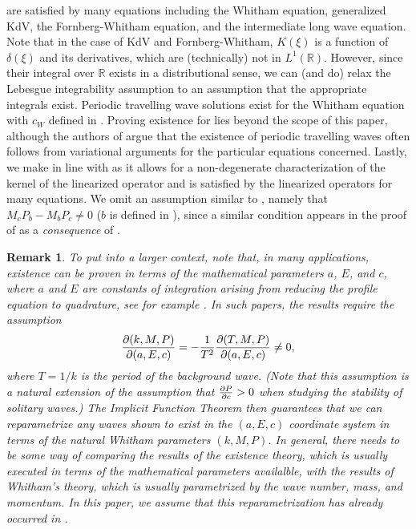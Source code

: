 \documentclass[11pt,leqno]{article}
\numberwithin{equation}{section}
\newcommand{\R}{\mathbb R}
\newtheorem{remark}[theorem]{Remark}
\theoremstyle{definition}
\begin{document}
 are satisfied by many equations including the Whitham equation, generalized KdV, the Fornberg-Whitham equation, and the intermediate long wave equation. Note that in the case of KdV and Fornberg-Whitham, $ K(\xi) $ is a function of $ \delta(\xi) $ and its derivatives, which are (technically) not in $ L^{1}(\R) $. However, since their integral over $ \R $ exists in a distributional sense, we can (and do) relax the Lebesgue integrability assumption to an assumption that the appropriate integrals exist. Periodic travelling wave solutions exist for the Whitham equation with $ c_{W} $ defined in  \cite{EK09,EK13}. Proving existence for  lies beyond the scope of this paper, although the authors of \cite{BH14} argue that the existence of periodic travelling waves often follows from variational arguments for the particular equations concerned. Lastly, we make  in line with \cite[Assumption 5.N2]{BH14} as it allows for a non-degenerate characterization of the kernel of the linearized operator  and is satisfied by the linearized operators for many equations. We omit an assumption similar to \cite[Assumption 5.N3]{BH14}, namely that $ M_{c}P_{b} - M_{b}P_{c} \neq 0 $ ($ b $ is defined in ), since a similar condition appears in the proof of  as a {\it consequence} of .

\begin{remark}
    To put  into a larger context, note that, in many applications, existence can be proven in terms of the mathematical parameters $a$, $E$, and $c$, where $a$ and $E$ are constants of integration arising from reducing the profile equation to quadrature, see for example \cite{JP2020,JZ2010}.  In such papers, the results require the assumption
    \[
    \pdv{(k,M,P)}{(a,E,c)} = -\frac{1}{T^2}\pdv{(T,M,P)}{(a,E,c)}\neq0,
    \]
    where $T=1/k$ is the period of the background wave.  (Note that this assumption is a natural extension of the assumption that $\pdv{P}{c}>0$ when studying the stability of solitary waves.)  The Implicit Function Theorem then guarantees that we can reparametrize any waves shown to exist in the $(a,E,c)$ coordinate system in terms of the natural Whitham parameters $(k,M,P)$.  In general, there needs to be some way of comparing the results of the existence theory, which is usually executed in terms of the mathematical parameters availalble, with the results of Whitham's theory, which is usually parametrized by the wave number, mass, and momentum.  In this paper, we assume that this reparametrization has already occurred in .  %
\end{remark}
\end{document}
